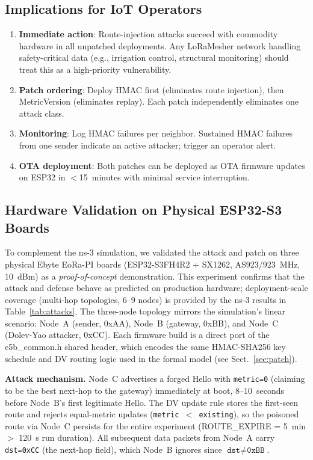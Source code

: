 \documentclass[10pt,journal,compsoc]{IEEEtran}
\begin{document}
\subsection{Implications for IoT Operators}

\begin{enumerate}
  \item \textbf{Immediate action}: Route-injection attacks succeed
    with commodity hardware in all unpatched deployments. Any
    LoRaMesher network handling safety-critical data (e.g.,
    irrigation control, structural monitoring) should treat this
    as a high-priority vulnerability.
  \item \textbf{Patch ordering}: Deploy HMAC first (eliminates
    route injection), then MetricVersion (eliminates replay).
    Each patch independently eliminates one attack class.
  \item \textbf{Monitoring}: Log HMAC failures per neighbor.
    Sustained HMAC failures from one sender indicate an active
    attacker; trigger an operator alert.
  \item \textbf{OTA deployment}: Both patches can be deployed as
    OTA firmware updates on ESP32 in $<$15~minutes with minimal
    service interruption.
\end{enumerate}

\subsection{Hardware Validation on Physical ESP32-S3 Boards}
\label{sec:hardware-validation}

To complement the ns-3 simulation, we validated the attack and patch
on three physical Ebyte EoRa-PI boards (ESP32-S3FH4R2 + SX1262,
AS923/923~MHz, 10~dBm) as a \emph{proof-of-concept} demonstration.
This experiment confirms that the attack and defense behave as
predicted on production hardware; deployment-scale coverage
(multi-hop topologies, 6–9 nodes) is provided by the ns-3 results
in Table~\ref{tab:attacks}.
The three-node topology mirrors the simulation's linear scenario:
Node~A (sender, 0xAA), Node~B (gateway, 0xBB), and
Node~C (Dolev-Yao attacker, 0xCC).
Each firmware build is a direct port of the e5b\_common.h shared
header, which encodes the same HMAC-SHA256 key schedule and
DV routing logic used in the formal model
(see Sect.~\ref{sec:patch}).

\textbf{Attack mechanism.}
Node~C advertises a forged Hello with \texttt{metric=0}
(claiming to be the best next-hop to the gateway)
immediately at boot, 8–10~seconds before Node~B's first
legitimate Hello.
The DV update rule stores the first-seen route and rejects
equal-metric updates (\texttt{metric~$<$~existing}), so the
poisoned route via Node~C persists for the entire experiment
(ROUTE\_EXPIRE = 5~min $>$ 120~s run duration).
All subsequent data packets from Node~A carry
\texttt{dst=0xCC} (the next-hop field), which Node~B ignores
since $\texttt{dst}\neq\texttt{0xBB}$.
\end{document}
